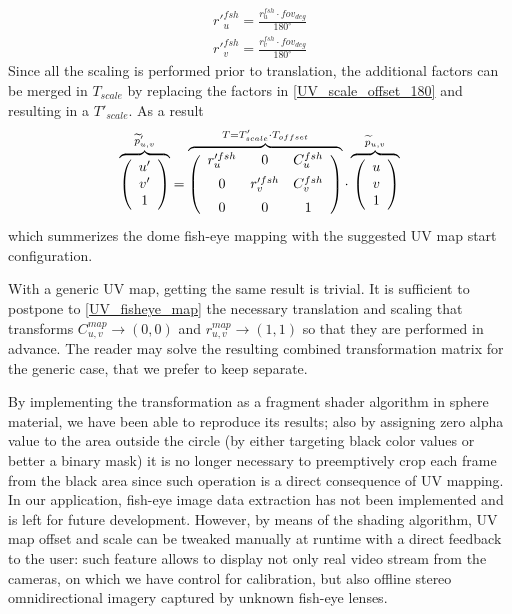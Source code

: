 \begin{equation}
\begin{array}{c}
r'^{fsh}_{u}=\frac{r^{fsh}_{u} \cdot fov_{deg}}{180^{\circ}}\\[0.6em]
r'^{fsh}_{v}=\frac{r^{fsh}_{v} \cdot fov_{deg}}{180^{\circ}}
\end{array}
\end{equation}
Since all the scaling is performed prior to translation, the additional factors can be merged in $T_{scale}$ by replacing the factors in \ref{UV_scale_offset_180} and resulting in a $T'_{scale}$.
As a result
\begin{equation}
\overbrace{
\left(\begin{array}{c}
u'\\
v'\\
1
\end{array}\right)
}^{\widetilde p'_{u,v}}=
\overbrace{
\left( \begin{array}{ccc}
r'^{fsh}_{u} & 0 & C^{fsh}_{u}\\[0.5em]
0 & r'^{fsh}_{v} & C^{fsh}_{v}\\[0.5em]
0 & 0 & 1
\end{array} \right)
}^{T=T'_{scale} \cdot T_{offset}}
 \cdot 
\xoverbrace{
\left(
\begin{array}{c}
u\\
v\\
1
\end{array}
\right)
}^{\widetilde p_{u,v}}
\label{UV_fisheye_map}
\end{equation}
which summerizes the dome fish-eye mapping with the suggested UV map start configuration.

With a generic UV map, getting the same result is trivial. It is sufficient to postpone to \ref{UV_fisheye_map} the necessary translation and scaling that transforms $C^{map}_{u,v} \longrightarrow (0,0)$ and $r^{map}_{u,v} \longrightarrow (1,1)$ so that they are performed in advance. The reader may solve the resulting combined transformation matrix for the generic case, that we prefer to keep separate.

By implementing the transformation as a fragment shader algorithm in sphere material, we have been able to reproduce its results; also by assigning zero alpha value to the area outside the circle (by either targeting black color values or better a binary mask) it is no longer necessary to preemptively crop each frame from the black area since such operation is a direct consequence of UV mapping.\\
In our application, fish-eye image data extraction has not been implemented and is left for future development. However, by means of the shading algorithm, UV map offset and scale can be tweaked manually at runtime with a direct feedback to the user: such feature allows to display not only real video stream from the cameras, on which we have control for calibration, but also offline stereo omnidirectional imagery captured by unknown fish-eye lenses.

